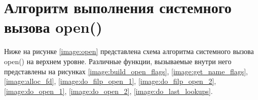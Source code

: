 \section{Алгоритм выполнения системного вызова open()}
Ниже на рисунке \ref{image:open} представлена схема алгоритма системного вызова open() на верхнем уровне. Различные функции, вызываемые внутри него представлены на рисунках \ref{image:build_open_flags}, \ref{image:get_name_flags}, \ref{image:alloc_fd}, \ref{image:do_filp_open_1}, \ref{image:do_filp_open_2}, \ref{image:do_open_1}, \ref{image:do_open_2}, \ref{image:do_last_lookups}.
\newpage
\begin{figure}[H]
	\captionsetup{justification=centering}
\end{figure}

